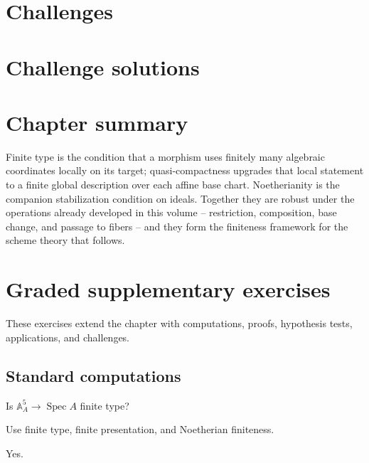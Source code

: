 \section{Challenges}






\ifdefined\IncludeChallengeSolutions
\section{Challenge solutions}

\fi

\section{Chapter summary}
Finite type is the condition that a morphism uses finitely many algebraic coordinates locally on its target;
quasi-compactness upgrades that local statement to a finite global description over each affine base chart.
Noetherianity is the companion stabilization condition on ideals.  Together they are robust under the operations
already developed in this volume -- restriction, composition, base change, and passage to fibers -- and they form
the finiteness framework for the scheme theory that follows.



\section{Graded supplementary exercises}
These exercises extend the chapter with computations, proofs, hypothesis tests, applications, and challenges.

\subsection*{Standard computations}

\begin{exercise}\label{exr:vi26-expand-01}
Is $\mathbb A^5_A\to\operatorname{Spec}A$ finite type?
\end{exercise}
\begin{hint}
Use finite type, finite presentation, and Noetherian finiteness.
\end{hint}
\begin{solution}
Yes.
\end{solution}

